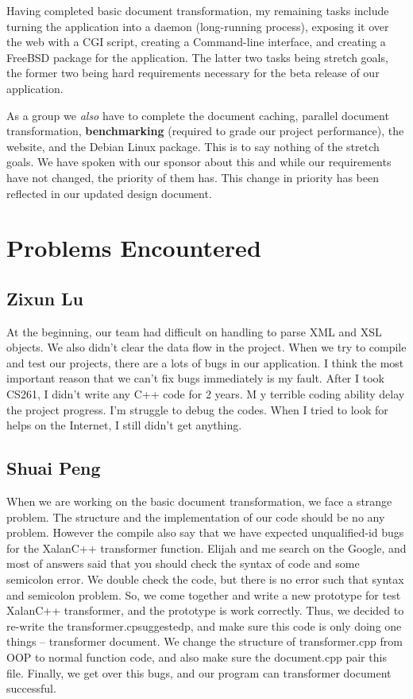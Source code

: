 Having completed basic document transformation, my remaining tasks include turning the application into a daemon (long-running process), exposing it over the web with a CGI script, creating a Command-line interface, and creating a FreeBSD package for the application.
The latter two tasks being stretch goals, the former two being hard requirements necessary for the beta release of our application.

As a group we \textit{also} have to complete the document caching, parallel document transformation, \textbf{benchmarking} (required to grade our project performance), the website, and the Debian Linux package.
This is to say nothing of the stretch goals.
We have spoken with our sponsor about this and while our requirements have not changed, the priority of them has.
This change in priority has been reflected in our updated design document.

\section{Problems Encountered}

\subsection{Zixun Lu}

At the beginning, our team had difficult on handling to parse XML and XSL objects.
We also didn’t clear the data flow in the project.
When we try to compile and test our projects, there are a lots of bugs in our application. 
I think the most important reason that we can’t fix bugs immediately is my fault. 
After I took CS261, I didn’t write any C++ code for 2 years. M
y terrible coding ability delay the project progress. I’m struggle to debug the codes. 
When I tried to look for helps on the Internet, I still didn’t get anything. 

\subsection{Shuai Peng}

When we are working on the basic document transformation, we face a strange problem.
The structure and the implementation of our code should be no any problem.
However the compile also say that we have expected unqualified-id bugs for the XalanC++ transformer function.
Elijah and me search on the Google, and most of answers said that you should check the syntax of code and some semicolon error.
We double check the code, but there is no error such that syntax and semicolon problem.
So, we come together and write a new prototype for test XalanC++ transformer, and the prototype is work correctly.
Thus, we decided to re-write the transformer.cpsuggestedp, and make sure this code is only doing one things -- transformer document.
We change the structure of transformer.cpp from OOP to normal function code, and also make sure the document.cpp pair this file.
Finally, we get over this bugs, and our program can transformer document successful. 

